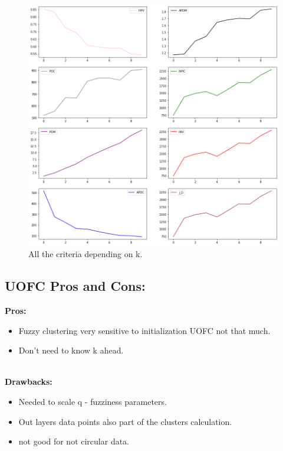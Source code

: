 \documentclass[12pt, a4paper]{paper}
\begin{document}
\begin{figure}[h!]
\centering
\includegraphics[scale=0.4]{circle_uofc.png}
\caption{All the criteria depending on k.}
\label{fig:Circular_3}
\end{figure}

\newpage
\subsection*{UOFC Pros and Cons:}

\textbf{Pros:}
\begin{itemize}
    \item Fuzzy clustering very sensitive to initialization UOFC not that much. 
    \item Don't need to know k ahead. 
\end{itemize}\\
\textbf{Drawbacks:}
\begin{itemize}
    \item Needed to scale q - fuzziness parameters.
    \item Out layers data points also part of the clusters calculation. 
    \item not good for not circular data. 
\end{itemize}

\newpage
\end{document}
